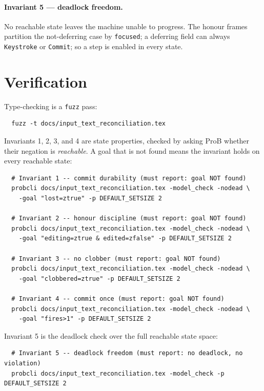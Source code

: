 \documentclass[a4paper,10pt,fleqn]{article}
\begin{document}
\paragraph{Invariant 5 --- deadlock freedom.}
No reachable state leaves the machine unable to progress.  The honour frames
partition the not-deferring case by \texttt{focused}; a deferring field can
always \texttt{Keystroke} or \texttt{Commit}; so a step is enabled in every
state.

\section{Verification}
\label{sec:verify}

Type-checking is a \texttt{fuzz} pass:
\begin{verbatim}
  fuzz -t docs/input_text_reconciliation.tex
\end{verbatim}

Invariants 1, 2, 3, and 4 are state properties, checked by asking ProB whether
their negation is \emph{reachable}.  A goal that is not found means the invariant
holds on every reachable state:
\begin{verbatim}
  # Invariant 1 -- commit durability (must report: goal NOT found)
  probcli docs/input_text_reconciliation.tex -model_check -nodead \
    -goal "lost=ztrue" -p DEFAULT_SETSIZE 2

  # Invariant 2 -- honour discipline (must report: goal NOT found)
  probcli docs/input_text_reconciliation.tex -model_check -nodead \
    -goal "editing=ztrue & edited=zfalse" -p DEFAULT_SETSIZE 2

  # Invariant 3 -- no clobber (must report: goal NOT found)
  probcli docs/input_text_reconciliation.tex -model_check -nodead \
    -goal "clobbered=ztrue" -p DEFAULT_SETSIZE 2

  # Invariant 4 -- commit once (must report: goal NOT found)
  probcli docs/input_text_reconciliation.tex -model_check -nodead \
    -goal "fires>1" -p DEFAULT_SETSIZE 2
\end{verbatim}

Invariant 5 is the deadlock check over the full reachable state space:
\begin{verbatim}
  # Invariant 5 -- deadlock freedom (must report: no deadlock, no violation)
  probcli docs/input_text_reconciliation.tex -model_check -p DEFAULT_SETSIZE 2
\end{verbatim}
\end{document}

